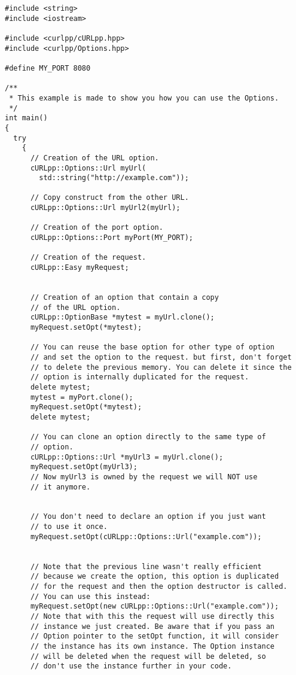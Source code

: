 \documentclass{article}
\begin{document}
\begin{verbatim}
#include <string>
#include <iostream>

#include <curlpp/cURLpp.hpp>
#include <curlpp/Options.hpp>

#define MY_PORT 8080

/** 
 * This example is made to show you how you can use the Options.
 */
int main()
{
  try
    {
      // Creation of the URL option.
      cURLpp::Options::Url myUrl(
        std::string("http://example.com"));
      
      // Copy construct from the other URL.
      cURLpp::Options::Url myUrl2(myUrl);

      // Creation of the port option.
      cURLpp::Options::Port myPort(MY_PORT);

      // Creation of the request.
      cURLpp::Easy myRequest;


      // Creation of an option that contain a copy 
      // of the URL option.
      cURLpp::OptionBase *mytest = myUrl.clone();
      myRequest.setOpt(*mytest);

      // You can reuse the base option for other type of option
      // and set the option to the request. but first, don't forget 
      // to delete the previous memory. You can delete it since the 
      // option is internally duplicated for the request.
      delete mytest;
      mytest = myPort.clone();
      myRequest.setOpt(*mytest);
      delete mytest;

      // You can clone an option directly to the same type of 
      // option.
      cURLpp::Options::Url *myUrl3 = myUrl.clone();
      myRequest.setOpt(myUrl3);
      // Now myUrl3 is owned by the request we will NOT use 
      // it anymore.


      // You don't need to declare an option if you just want 
      // to use it once.
      myRequest.setOpt(cURLpp::Options::Url("example.com"));


      // Note that the previous line wasn't really efficient
      // because we create the option, this option is duplicated
      // for the request and then the option destructor is called.
      // You can use this instead:
      myRequest.setOpt(new cURLpp::Options::Url("example.com"));
      // Note that with this the request will use directly this
      // instance we just created. Be aware that if you pass an
      // Option pointer to the setOpt function, it will consider
      // the instance has its own instance. The Option instance
      // will be deleted when the request will be deleted, so
      // don't use the instance further in your code.



\end{verbatim}
\end{document}
